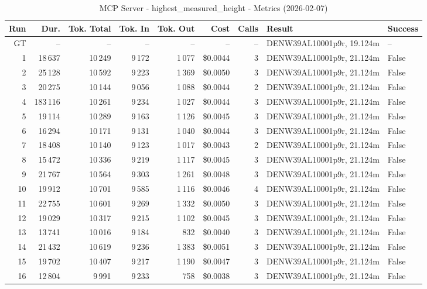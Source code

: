 \documentclass[a4paper,11pt]{article}
\begin{document}
\begin{table}[ht]
\centering
\scriptsize
\caption{MCP Server - highest\_measured\_height - Metrics (2026-02-07)}
\label{tab:mcp\_highest\_measured\_height\_metrics\_2026-02-07}
\begin{tabular}{r r r r r r r p{3cm} l}
\hline
Run & Dur. & Tok. Total & Tok. In & Tok. Out & Cost & Calls & Result & Success \\
\hline
GT & -- & -- & -- & -- & -- & -- & DENW39AL10001p9r, 19.124m & -- \\
1 & 18\,637 & 10\,249 & 9\,172 & 1\,077 & \$0.0044 & 3 & DENW39AL10001p9r, 21.124m & False \\
2 & 25\,128 & 10\,592 & 9\,223 & 1\,369 & \$0.0050 & 3 & DENW39AL10001p9r, 21.124m & False \\
3 & 20\,275 & 10\,144 & 9\,056 & 1\,088 & \$0.0044 & 2 & DENW39AL10001p9r, 21.124m & False \\
4 & 183\,116 & 10\,261 & 9\,234 & 1\,027 & \$0.0044 & 3 & DENW39AL10001p9r, 21.124m & False \\
5 & 19\,114 & 10\,289 & 9\,163 & 1\,126 & \$0.0045 & 3 & DENW39AL10001p9r, 21.124m & False \\
6 & 16\,294 & 10\,171 & 9\,131 & 1\,040 & \$0.0044 & 3 & DENW39AL10001p9r, 21.124m & False \\
7 & 18\,408 & 10\,140 & 9\,123 & 1\,017 & \$0.0043 & 2 & DENW39AL10001p9r, 21.124m & False \\
8 & 15\,472 & 10\,336 & 9\,219 & 1\,117 & \$0.0045 & 3 & DENW39AL10001p9r, 21.124m & False \\
9 & 21\,767 & 10\,564 & 9\,303 & 1\,261 & \$0.0048 & 3 & DENW39AL10001p9r, 21.124m & False \\
10 & 19\,912 & 10\,701 & 9\,585 & 1\,116 & \$0.0046 & 4 & DENW39AL10001p9r, 21.124m & False \\
11 & 22\,755 & 10\,601 & 9\,269 & 1\,332 & \$0.0050 & 3 & DENW39AL10001p9r, 21.124m & False \\
12 & 19\,029 & 10\,317 & 9\,215 & 1\,102 & \$0.0045 & 3 & DENW39AL10001p9r, 21.124m & False \\
13 & 13\,741 & 10\,016 & 9\,184 & 832 & \$0.0040 & 3 & DENW39AL10001p9r, 21.124m & False \\
14 & 21\,432 & 10\,619 & 9\,236 & 1\,383 & \$0.0051 & 3 & DENW39AL10001p9r, 21.124m & False \\
15 & 19\,702 & 10\,407 & 9\,217 & 1\,190 & \$0.0047 & 3 & DENW39AL10001p9r, 21.124m & False \\
16 & 12\,804 & 9\,991 & 9\,233 & 758 & \$0.0038 & 3 & DENW39AL10001p9r, 21.124m & False \\

\end{tabular}
\end{table}
\end{document}
